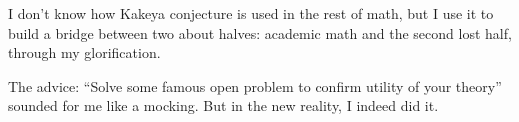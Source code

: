 \documentclass[oneside,draft]{amsart}
\begin{document}
I don't know how Kakeya conjecture is used in the rest of math, but I use it to build a bridge between two about halves: academic math and the second lost half, through my glorification.

The advice: ``Solve some famous open problem to confirm utility of your theory'' sounded for me like a mocking. But in the new reality, I indeed did it.



\end{document}
